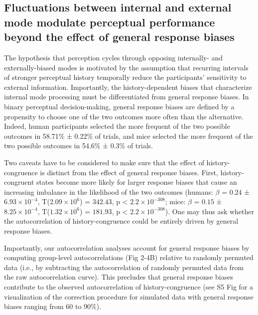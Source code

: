 \documentclass[
]{article}
\begin{document}
\hypertarget{fluctuations-between-internal-and-external-mode-modulate-perceptual-performance-beyond-the-effect-of-general-response-biases}{%
\subsection{Fluctuations between internal and external mode modulate
perceptual performance beyond the effect of general response
biases}\label{fluctuations-between-internal-and-external-mode-modulate-perceptual-performance-beyond-the-effect-of-general-response-biases}}

The hypothesis that perception cycles through opposing internally- and
externally-biased modes is motivated by the assumption that recurring
intervals of stronger perceptual history temporally reduce the
participants' sensitivity to external information. Importantly, the
history-dependent biases that characterize internal mode processing must
be differentiated from general response biases. In binary perceptual
decision-making, general response biases are defined by a propensity to
choose one of the two outcomes more often than the alternative. Indeed,
human participants selected the more frequent of the two possible
outcomes in 58.71\% ± 0.22\% of trials, and mice selected the more
frequent of the two possible outcomes in 54.6\% ± 0.3\% of trials.

Two caveats have to be considered to make sure that the effect of
history-congruence is distinct from the effect of general response
biases. First, history-congruent states become more likely for larger
response biases that cause an increasing imbalance in the likelihood of
the two outcomes (humans: \(\beta\) = \(0.24\) ±
\(\ensuremath{6.93\times 10^{-4}}\),
T(\(\ensuremath{2.09\times 10^{6}}\)) = \(342.43\), p < \(\ensuremath{2.2\times 10^{-308}}\); mice:
\(\beta\) = \(0.15\) ± \(\ensuremath{8.25\times 10^{-4}}\),
T(\(\ensuremath{1.32\times 10^{6}}\)) = \(181.93\), p < \(\ensuremath{2.2\times 10^{-308}}\)). One may
thus ask whether the autocorrelation of history-congruence could be
entirely driven by general response biases.

Importantly, our autocorrelation analyses account for general response
biases by computing group-level autocorrelations (Fig 2-4B) relative
to randomly permuted data (i.e., by subtracting the autocorrelation of
randomly permuted data from the raw autocorrelation curve). This
precludes that general response biases contribute to the observed
autocorrelation of history-congruence (see S5 Fig for a
visualization of the correction procedure for simulated data with
general response biases ranging from 60 to 90\%).
\end{document}
